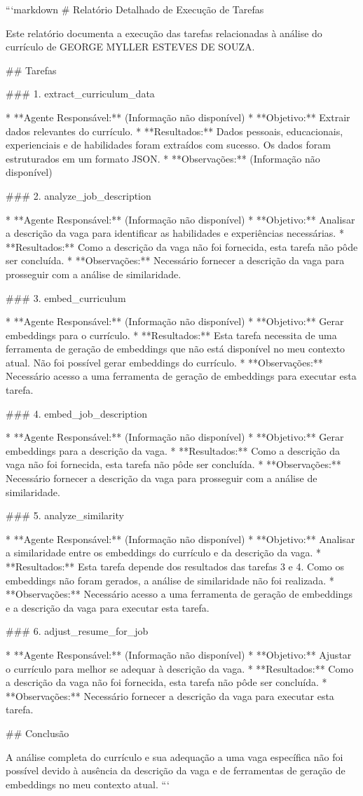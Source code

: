 ```markdown
# Relatório Detalhado de Execução de Tarefas

Este relatório documenta a execução das tarefas relacionadas à análise do currículo de GEORGE MYLLER ESTEVES DE SOUZA.

## Tarefas

### 1. extract_curriculum_data

* **Agente Responsável:**  (Informação não disponível)
* **Objetivo:** Extrair dados relevantes do currículo.
* **Resultados:** Dados pessoais, educacionais, experienciais e de habilidades foram extraídos com sucesso.  Os dados foram estruturados em um formato JSON.
* **Observações:** (Informação não disponível)

### 2. analyze_job_description

* **Agente Responsável:** (Informação não disponível)
* **Objetivo:** Analisar a descrição da vaga para identificar as habilidades e experiências necessárias.
* **Resultados:** Como a descrição da vaga não foi fornecida, esta tarefa não pôde ser concluída.
* **Observações:** Necessário fornecer a descrição da vaga para prosseguir com a análise de similaridade.

### 3. embed_curriculum

* **Agente Responsável:** (Informação não disponível)
* **Objetivo:** Gerar embeddings para o currículo.
* **Resultados:** Esta tarefa necessita de uma ferramenta de geração de embeddings que não está disponível no meu contexto atual.  Não foi possível gerar embeddings do currículo.
* **Observações:** Necessário acesso a uma ferramenta de geração de embeddings para executar esta tarefa.

### 4. embed_job_description

* **Agente Responsável:** (Informação não disponível)
* **Objetivo:** Gerar embeddings para a descrição da vaga.
* **Resultados:**  Como a descrição da vaga não foi fornecida, esta tarefa não pôde ser concluída.
* **Observações:** Necessário fornecer a descrição da vaga para prosseguir com a análise de similaridade.

### 5. analyze_similarity

* **Agente Responsável:** (Informação não disponível)
* **Objetivo:** Analisar a similaridade entre os embeddings do currículo e da descrição da vaga.
* **Resultados:** Esta tarefa depende dos resultados das tarefas 3 e 4.  Como os embeddings não foram gerados, a análise de similaridade não foi realizada.
* **Observações:**  Necessário acesso a uma ferramenta de geração de embeddings e a descrição da vaga para executar esta tarefa.

### 6. adjust_resume_for_job

* **Agente Responsável:** (Informação não disponível)
* **Objetivo:** Ajustar o currículo para melhor se adequar à descrição da vaga.
* **Resultados:** Como a descrição da vaga não foi fornecida, esta tarefa não pôde ser concluída. 
* **Observações:** Necessário fornecer a descrição da vaga para executar esta tarefa.

## Conclusão

A análise completa do currículo e sua adequação a uma vaga específica não foi possível devido à ausência da descrição da vaga e de ferramentas de geração de embeddings no meu contexto atual.
```